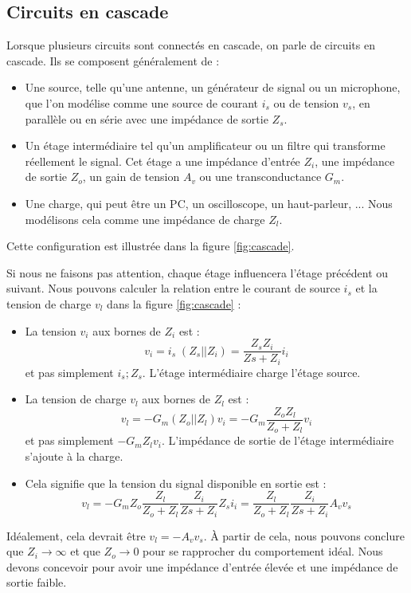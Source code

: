 \subsection{Circuits en cascade}

Lorsque plusieurs circuits sont connectés en cascade, on parle de circuits en cascade. Ils se composent généralement de :

\begin{itemize}
	\item Une source, telle qu'une antenne, un générateur de signal ou un microphone, que l'on modélise comme une source de courant $i_s$ ou de tension $v_s$, en parallèle ou en série avec une impédance de sortie $Z_s$.
	\item Un étage intermédiaire tel qu'un amplificateur ou un filtre qui transforme réellement le signal. Cet étage a une impédance d'entrée $Z_i$, une impédance de sortie $Z_o$, un gain de tension $A_v$ ou une transconductance $G_m$.
	\item Une charge, qui peut être un PC, un oscilloscope, un haut-parleur, ... Nous modélisons cela comme une impédance de charge $Z_l$.
\end{itemize}

Cette configuration est illustrée dans la figure \ref{fig:cascade}.

Si nous ne faisons pas attention, chaque étage influencera l'étage précédent ou suivant. Nous pouvons calculer la relation entre le courant de source $i_s$ et la tension de charge $v_l$ dans la figure \ref{fig:cascade} :

\begin{itemize}
	\item La tension $v_i$ aux bornes de $Z_i$ est :
	$$v_i = i_s\;(Z_s || Z_i) = \frac{Z_s Z_i}{Zs+Z_i} i_i$$
	et pas simplement $i_s;Z_s$. L'étage intermédiaire charge l'étage source.
	\item La tension de charge $v_l$ aux bornes de $Z_l$ est :
	$$v_l = - G_m (Z_o || Z_l) v_i = -G_m \frac{Z_o Z_l}{Z_o + Z_l} v_i$$ 
	et pas simplement $-G_m Z_l v_i$. L'impédance de sortie de l'étage intermédiaire s'ajoute à la charge.
	\item Cela signifie que la tension du signal disponible en sortie est :
	$$v_l = -G_m Z_o  \frac{Z_l}{Z_o + Z_l} \frac{Z_i}{Zs+Z_i} Z_s i_i = \frac{Z_l}{Z_o + Z_l} \frac{Z_i}{Zs+Z_i} A_v v_s$$
\end{itemize}
Idéalement, cela devrait être $v_l = - A_v v_s$. À partir de cela, nous pouvons conclure que $Z_i \rightarrow \infty$ et que $Z_o \rightarrow 0$ pour se rapprocher du comportement idéal. Nous devons concevoir pour avoir une impédance d'entrée élevée et une impédance de sortie faible.